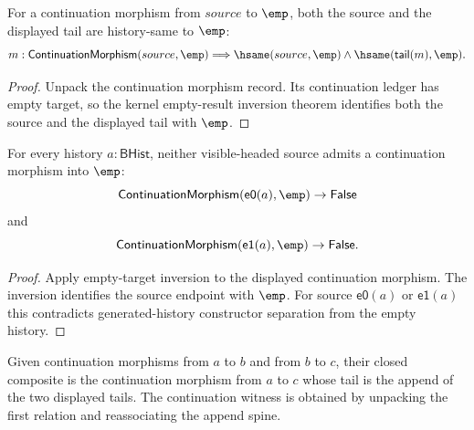 \begin{theorem}
\label{thm:continuation-morphism-empty-target-inversion}
For a continuation morphism from $source$ to $\emp$, both the source and the
displayed tail are history-same to $\emp$:
$$
m:\mathsf{ContinuationMorphism}(source,\emp)
\Longrightarrow
\hsame(source,\emp)\land\hsame(\mathsf{tail}(m),\emp).
$$
\end{theorem}
\begin{proof}
Unpack the continuation morphism record. Its continuation ledger has empty
target, so the kernel empty-result inversion theorem identifies both the
source and the displayed tail with $\emp$.
\end{proof}

\begin{theorem}
\label{thm:continuation-morphism-visible-source-empty-target-absurd}
For every history $a:\mathsf{BHist}$, neither visible-headed source admits a
continuation morphism into $\emp$:
$$
\mathsf{ContinuationMorphism}(\mathsf{e0}(a),\emp)\to\mathsf{False}
$$
and
$$
\mathsf{ContinuationMorphism}(\mathsf{e1}(a),\emp)\to\mathsf{False}.
$$
\end{theorem}
\begin{proof}
Apply empty-target inversion to the displayed continuation morphism. The
inversion identifies the source endpoint with $\emp$. For source
$\mathsf{e0}(a)$ or $\mathsf{e1}(a)$ this contradicts generated-history
constructor separation from the empty history.
\end{proof}

\begin{definition}
\label{def:continuation-morphism-comp-closed}
Given continuation morphisms from \(a\) to \(b\) and from \(b\) to \(c\), their
closed composite is the continuation morphism from \(a\) to \(c\) whose tail is
the append of the two displayed tails. The continuation witness is obtained by
unpacking the first relation and reassociating the append spine.
\end{definition}

